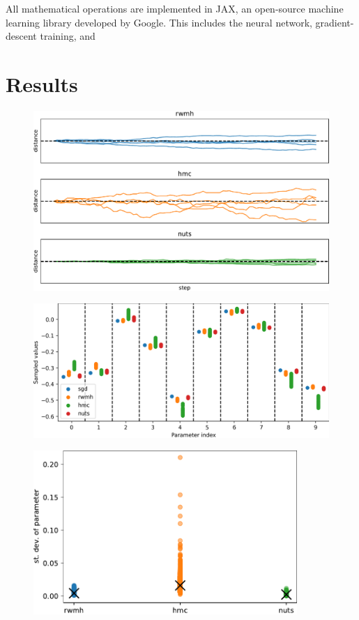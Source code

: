 \documentclass[12pt]{article}
\begin{document}
{All mathematical operations are implemented in JAX, an open-source machine learning library developed by Google. This includes the neural network, gradient-descent training, and 

\section{Results}
\label{sec_results}

\begin{figure}[ht]
\centering
\includegraphics[width=16cm]{plots/uci_param_history.pdf}
\caption{}
\label{fig_uci_param_history}
\end{figure}

\begin{figure}[ht]
\centering
\includegraphics[width=15cm]{plots/uci_param_distribution.png}
\caption{}
\label{fig_uci_param_distribution}
\end{figure}

\begin{figure}[ht]
\centering
\includegraphics[width=10cm]{plots/uci_param_stdev.pdf}
\caption{}
\label{fig_uci_param_stdev}
\end{figure}

}
\end{document}
